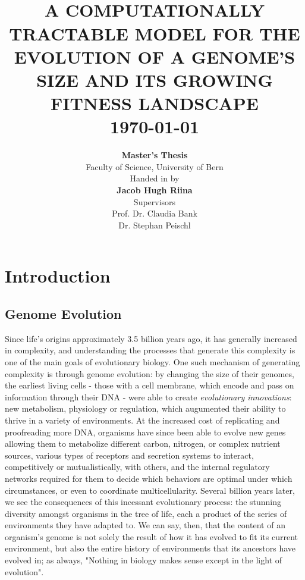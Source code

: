 \documentclass[paper=a4, fontsize=11pt,twoside]{scrartcl}       %
\title{
                        \HRule{0.5pt} \\                                                %
                        \LARGE \textbf{\uppercase{A Computationally Tractable Model for the Evolution of a Genome's Size and its Growing Fitness Landscape}}      %
                        \HRule{2pt} \\ [0.5cm]          %
                        \normalsize \today                      %
                }
\author{
                \textbf{Master's Thesis}\\
                Faculty of Science, University of Bern\\
                \vspace{1cm}
                Handed in by \\
                \textbf{Jacob Hugh Riina} \\
                \vfill
                Supervisors\\
                Prof. Dr. Claudia Bank\\
                Dr. Stephan Peischl\\
}
\makeatletter
\def\printtitle{%
    {\centering \@title\par}}
\def\printauthor{%
    {\centering \large \@author}}
\makeatother
\begin{document}

\thispagestyle{empty}           %

\printtitle                                     %
        \vfill
\printauthor                            %
\newpage


\setcounter{page}{1}            %

\section*{Introduction}

\subsection*{Genome Evolution}

Since life's origins approximately 3.5 billion years ago, it has generally increased in complexity, and understanding the processes that generate this complexity is one of the main goals of evolutionary biology. One such mechanism of generating complexity is through genome evolution: by changing the size of their genomes, the earliest living cells - those with a cell membrane, which encode and pass on information through their DNA - were able to create \textit{evolutionary innovations}: new metabolism, physiology or regulation, which augumented their ability to thrive in a variety of environments. At the increased cost of replicating and proofreading more DNA, organisms have since been able to evolve new genes allowing them to metabolize different carbon, nitrogen, or complex nutrient sources, various types of receptors and secretion systems to interact, competitively or mutualistically, with others, and the internal regulatory networks required for them to decide which behaviors are optimal under which circumstances, or even to coordinate multicellularity. Several billion years later, we see the consequences of this incessant evolutionary process: the stunning diversity amongst organisms in the tree of life, each a product of the series of environments they have adapted to. We can say, then, that the content of an organism's genome is not solely the result of how it has evolved to fit its current environment, but also the entire history of environments that its ancestors have evolved in; as always, "Nothing in biology makes sense except in the light of evolution".\\ 
\end{document}
